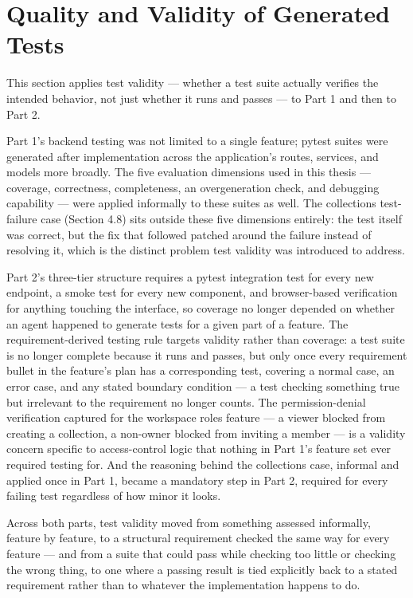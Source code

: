 \section{Quality and Validity of Generated Tests}

This section applies test validity --- whether a test suite actually verifies the intended behavior, not just whether it runs and passes --- to Part 1 and then to Part 2.

Part 1's backend testing was not limited to a single feature; pytest suites were generated after implementation across the application's routes, services, and models more broadly. The five evaluation dimensions used in this thesis --- coverage, correctness, completeness, an overgeneration check, and debugging capability --- were applied informally to these suites as well. The collections test-failure case (Section 4.8) sits outside these five dimensions entirely: the test itself was correct, but the fix that followed patched around the failure instead of resolving it, which is the distinct problem test validity was introduced to address.

Part 2's three-tier structure requires a pytest integration test for every new endpoint, a smoke test for every new component, and browser-based verification for anything touching the interface, so coverage no longer depended on whether an agent happened to generate tests for a given part of a feature. The requirement-derived testing rule targets validity rather than coverage: a test suite is no longer complete because it runs and passes, but only once every requirement bullet in the feature's plan has a corresponding test, covering a normal case, an error case, and any stated boundary condition --- a test checking something true but irrelevant to the requirement no longer counts. The permission-denial verification captured for the workspace roles feature --- a viewer blocked from creating a collection, a non-owner blocked from inviting a member --- is a validity concern specific to access-control logic that nothing in Part 1's feature set ever required testing for. And the reasoning behind the collections case, informal and applied once in Part 1, became a mandatory step in Part 2, required for every failing test regardless of how minor it looks.

Across both parts, test validity moved from something assessed informally, feature by feature, to a structural requirement checked the same way for every feature --- and from a suite that could pass while checking too little or checking the wrong thing, to one where a passing result is tied explicitly back to a stated requirement rather than to whatever the implementation happens to do.

